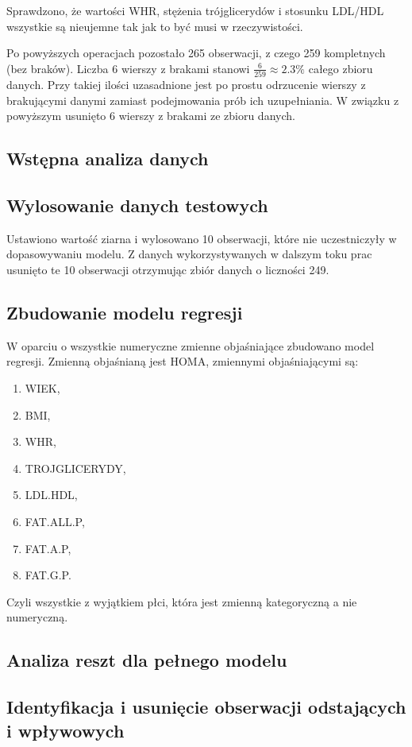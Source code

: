\documentclass{article}
\begin{document}
Sprawdzono, że wartości WHR, stężenia trójglicerydów i stosunku LDL/HDL wszystkie są nieujemne tak jak to być musi w rzeczywistości.

Po powyższych operacjach pozostało 265 obserwacji, z czego 259 kompletnych (bez braków). Liczba 6 wierszy z brakami stanowi $\frac{6}{259} \approx 2.3\%$ całego zbioru danych. Przy takiej ilości uzasadnione jest po prostu odrzucenie wierszy z brakującymi danymi zamiast podejmowania prób ich uzupełniania. W związku z powyższym usunięto 6 wierszy z brakami ze zbioru danych.

\subsection{Wstępna analiza danych}

\subsection{Wylosowanie danych testowych}
Ustawiono wartość ziarna i wylosowano 10 obserwacji, które nie uczestniczyły w dopasowywaniu modelu. Z danych wykorzystywanych w dalszym toku prac usunięto te 10 obserwacji otrzymując zbiór danych o liczności 249.

\subsection{Zbudowanie modelu regresji}
W oparciu o wszystkie numeryczne zmienne objaśniające zbudowano model regresji. Zmienną objaśnianą jest HOMA, zmiennymi objaśniającymi są: 
\begin{enumerate}
\item WIEK, 
\item BMI, 
\item WHR, 
\item TROJGLICERYDY, 
\item LDL.HDL, 
\item FAT.ALL.P, 
\item FAT.A.P, 
\item FAT.G.P.
\end{enumerate}
Czyli wszystkie z wyjątkiem płci, która jest zmienną kategoryczną a nie numeryczną.

\subsection{Analiza reszt dla pełnego modelu}

\subsection{Identyfikacja i usunięcie obserwacji odstających i wpływowych}
\end{document}
